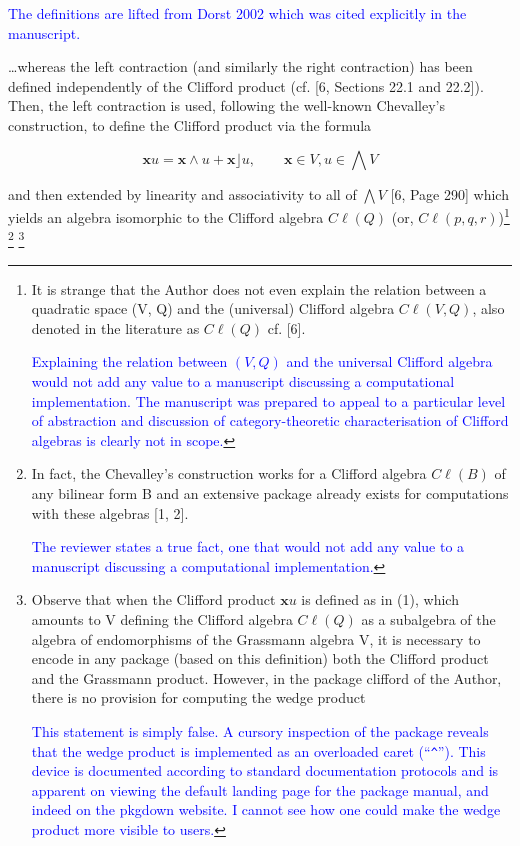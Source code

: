 \documentclass{article}
\newcommand{\cliff}[1]{\ensuremath{C\ell\left(#1\right)}}
\begin{document}
\begin{itemize}
    \textcolor{blue}{The definitions are lifted from Dorst 2002 which
      was cited explicitly in the manuscript.}

    \ldots whereas the left contraction (and similarly the
    right contraction) has been defined independently of the Clifford
    product (cf. [6, Sections 22.1 and 22.2]). Then, the left
    contraction is used, following the well-known Chevalley’s
    construction, to define the Clifford product via the formula

    $$
    \mathbf{x}u=\mathbf{x}\wedge u + \mathbf{x}\rfloor u,\qquad\mathbf{x}\in V,u\in\bigwedge V
    $$

and then extended by linearity and associativity to all of $\bigwedge V$ [6, Page
  290] which yields an algebra isomorphic to the Clifford algebra
\cliff{Q} (or, \cliff{p, q, r})\footnote{It is strange that the Author
does not even explain the relation between a quadratic space (V, Q)
and the (universal) Clifford algebra \cliff{V, Q}, also denoted in the
literature as \cliff{Q} cf. [6].

\textcolor{blue}{Explaining the relation between $(V,Q)$ and the
  universal Clifford algebra would not add any value to a manuscript
  discussing a computational implementation.  The manuscript was
  prepared to appeal to a particular level of abstraction and
  discussion of category-theoretic characterisation of Clifford
  algebras is clearly not in scope.}  } \footnote{In fact, the
Chevalley’s construction works for a Clifford algebra \cliff{B} of any
bilinear form B and an extensive package already exists for
computations with these algebras [1, 2].

\textcolor{blue}{The reviewer states a true fact, one that would not
  add any value to a manuscript discussing a computational
  implementation.}} \footnote{Observe that when the Clifford product
$\mathbf{x}u$ is defined as in (1), which amounts to V defining the Clifford
algebra \cliff{Q} as a subalgebra of the algebra of endomorphisms of
the Grassmann algebra V, it is necessary to encode in any package
(based on this definition) both the Clifford product and the Grassmann
product. However, in the package clifford of the Author, there is no
provision for computing the wedge product

\textcolor{blue}{This statement is simply false.  A cursory inspection
  of the package reveals that the wedge product is implemented as an
  overloaded caret (``{\tt\string^}'').  This device is documented
  according to standard documentation protocols and is apparent on
  viewing the default landing page for the package manual, and indeed
  on the pkgdown website.  I cannot see how one could make the wedge
  product more visible to users.}  }


\end{itemize}
\end{document}
